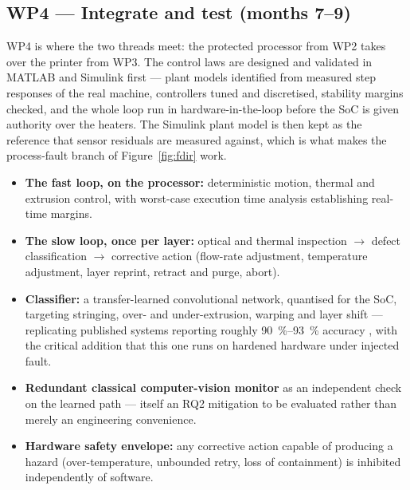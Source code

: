 \documentclass[11pt,a4paper]{article}
\begin{document}
\subsection{WP4 --- Integrate and test (months 7--9)}

WP4 is where the two threads meet: the protected processor from WP2 takes over
the printer from WP3. The control laws are designed and validated in MATLAB and
Simulink first --- plant models identified from measured step responses of the
real machine, controllers tuned and discretised, stability margins checked, and
the whole loop run in hardware-in-the-loop before the SoC is given authority over
the heaters. The Simulink plant model is then kept as the reference that sensor
residuals are measured against, which is what makes the process-fault branch of
Figure~\ref{fig:fdir} work.

\begin{itemize}
  \item \textbf{The fast loop, on the processor:} deterministic motion, thermal
        and extrusion control, with worst-case execution time analysis
        establishing real-time margins.
  \item \textbf{The slow loop, once per layer:} optical and thermal inspection
        \(\rightarrow\) defect classification \(\rightarrow\) corrective action
        (flow-rate adjustment, temperature adjustment, layer reprint, retract and
        purge, abort).
  \item \textbf{Classifier:} a transfer-learned convolutional network, quantised
        for the SoC, targeting stringing, over- and under-extrusion, warping and
        layer shift --- replicating published systems reporting roughly
        \SIrange{90}{93}{\percent} accuracy
        \cite{saluja2020warping,cirp2024closedloop}, with the critical addition
        that this one runs on hardened hardware under injected fault.
  \item \textbf{Redundant classical computer-vision monitor} as an independent
        check on the learned path --- itself an RQ2 mitigation to be evaluated
        rather than merely an engineering convenience.
  \item \textbf{Hardware safety envelope:} any corrective action capable of
        producing a hazard (over-temperature, unbounded retry, loss of
        containment) is inhibited independently of software.
\end{itemize}
\end{document}
